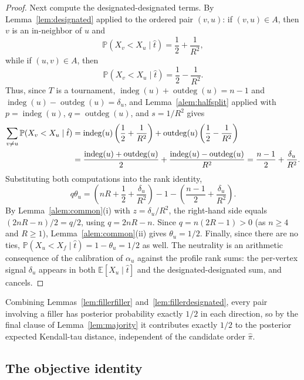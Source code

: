 \documentclass[11pt]{article}
\newcommand{\E}{\mathbb{E}}
\newcommand{\Prb}{\mathbb{P}}
\newcommand{\indeg}{\operatorname{indeg}}
\newcommand{\outdeg}{\operatorname{outdeg}}
\begin{document}
\begin{proof}
Next compute the designated-designated terms.  By Lemma~\ref{lem:designated} applied to the ordered pair $(v,u)$: if $(v,u)\in A$, then $v$ is an in-neighbor of $u$ and
\begin{equation}
  \Prb(X_v<X_u\mid \hat t)=\frac12+\frac1{R^2},
\end{equation}
while if $(u,v)\in A$, then
\begin{equation}
  \Prb(X_v<X_u\mid \hat t)=\frac12-\frac1{R^2}.
\end{equation}
Thus, since $T$ is a tournament, $\indeg(u)+\outdeg(u)=n-1$ and $\indeg(u)-\outdeg(u)=\delta_u$, and Lemma~\ref{alem:halfsplit} applied with $p=\indeg(u)$, $q=\outdeg(u)$, and $s=1/R^2$ gives
\begin{align}
  \sum_{v\ne u}\Prb(X_v<X_u\mid \hat t)
  &=\indeg(u)\left(\frac12+\frac1{R^2}\right)
    +\outdeg(u)\left(\frac12-\frac1{R^2}\right) \notag\\
  &=\frac{\indeg(u)+\outdeg(u)}{2}+\frac{\indeg(u)-\outdeg(u)}{R^2}
  =\frac{n-1}{2}+\frac{\delta_u}{R^2}.
\end{align}
Substituting both computations into the rank identity,
\begin{equation}
  q\theta_u
  =\left(nR+\frac12+\frac{\delta_u}{R^2}\right)-1
    -\left(\frac{n-1}{2}+\frac{\delta_u}{R^2}\right).
\end{equation}
By Lemma~\ref{alem:common}(i) with $z=\delta_u/R^2$, the right-hand side equals $(2nR-n)/2=q/2$, using $q=2nR-n$.  Since $q=n(2R-1)>0$ (as $n\ge 4$ and $R\ge 1$), Lemma~\ref{alem:common}(ii) gives $\theta_u=1/2$.  Finally, since there are no ties, $\Prb(X_u<X_f\mid \hat t)=1-\theta_u=1/2$ as well.  The neutrality is an arithmetic consequence of the calibration of $\alpha_u$ against the profile rank sums: the per-vertex signal $\delta_u$ appears in both $\E[X_u\mid\hat t]$ and the designated-designated sum, and cancels.
\end{proof}

Combining Lemmas~\ref{lem:fillerfiller} and~\ref{lem:fillerdesignated}, every pair involving a filler has posterior probability exactly $1/2$ in each direction, so by the final clause of Lemma~\ref{lem:majority} it contributes exactly $1/2$ to the posterior expected Kendall-tau distance, independent of the candidate order $\hat\pi$.

\subsection{The objective identity}
\end{document}
